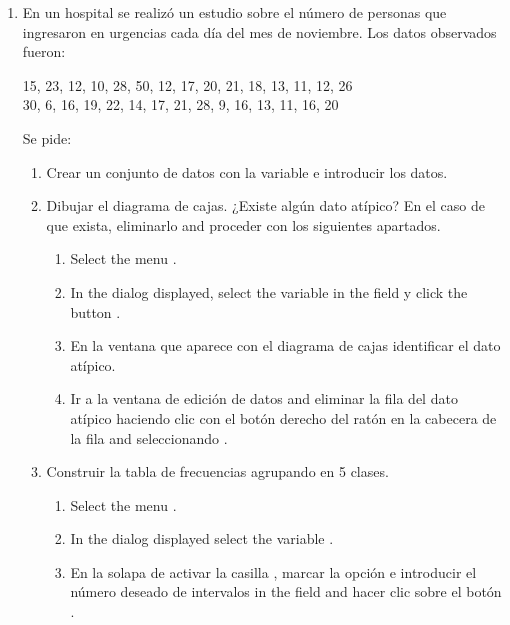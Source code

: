 \begin{enumerate}[leftmargin=*]
\item En un hospital se realizó un estudio sobre el número de personas que ingresaron en urgencias cada día del mes de
noviembre. Los datos observados fueron:
\begin{center}
15, 23, 12, 10, 28, 50, 12, 17, 20, 21, 18, 13, 11, 12, 26 \\
30, 6, 16, 19, 22, 14, 17, 21, 28, 9, 16, 13, 11, 16, 20
\end{center}
Se pide:

\begin{enumerate}
\item  Crear un conjunto de datos con la variable  e introducir los datos.

\item  Dibujar el diagrama de cajas. ¿Existe algún dato atípico? En el caso de que exista, eliminarlo and proceder con los
siguientes apartados.
\begin{indication}
\begin{enumerate}
\item Select the menu .
\item In the dialog displayed, select the variable  in the field  y
click the button .
\item En la ventana que aparece con el diagrama de cajas identificar el dato atípico.
\item Ir a la ventana de edición de datos and eliminar la fila del dato atípico haciendo clic con el botón derecho del
ratón en la cabecera de la fila and seleccionando . 
\end{enumerate}
\end{indication}

\item Construir la tabla de frecuencias agrupando en 5 clases.
\begin{indication}
\begin{enumerate}
\item Select the menu .
\item In the dialog displayed select the variable .
\item En la solapa de  activar la casilla , marcar la opción  e introducir el número deseado de intervalos in the field  and hacer clic sobre el botón
.
\end{enumerate}
\end{indication}


\end{enumerate}
\end{enumerate}
